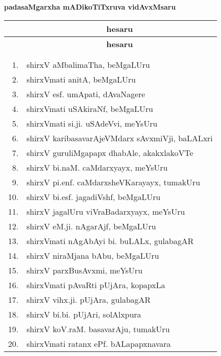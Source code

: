 \begin{center}
{\large\bf padasaMgarxha mADikoTiTxruva vidAvxMsaru}

\thispagestyle{empty}

\lhead[]{}
\rhead[]{}

\begin{minipage}[t]{7cm}
{\renewcommand{\arraystretch}{1.5}
\begin{longtable}{rl}
\hline
{\bf } & \multicolumn{1}{c}{\bf hesaru}\\[3pt]
\hline
\endfirsthead
\hline
{\bf } & \multicolumn{1}{c}{\bf hesaru}\\[3pt]
\hline
  & \\[-10pt]
\endhead
\endfoot
\endlastfoot
  & \\[-15pt]
1. & shirxV aMbalimaTha, beMgaLUru\\
2. & shirxVmati anitA, beMgaLUru\\
3. & shirxV esf. umApati, dAvaNagere\\
4. & shirxVmati uSAkiraNf, beMgaLUru\\
5. & shirxVmati si.ji. uSAdeVvi, meYsUru\\
6. & shirxV karibasavarAjeVMdarx sAvxmiVji, baLALxri\\
7. & shirxV guruliMgapapx dhabAle, akakxlakoVTe\\
8. & shirxV bi.naM. caMdarxyayx, meYsUru\\
9. & shirxV pi.enf. caMdarxsheVKarayayx, tumakUru\\
10. & shirxV bi.esf. jagadiVshf, beMgaLUru\\
11. & shirxV jagalUru viVraBadarxyayx, meYsUru\\
12. & shirxV eM.ji. nAgarAjf, beMgaLUru\\
13. &  shirxVmati nAgAbAyi bi. buLALx, gulabagAR\\
14. & shirxV niraMjana bAbu, beMgaLUru\\
15. & shirxV parxBusAvxmi, meYsUru\\
16. & shirxVmati pAvaRti pUjAra, kopapxLa\\
17. & shirxV vihx.ji. pUjAra, gulabagAR\\
18. & shirxV bi.bi. pUjAri, solAlxpura\\
19. & shirxV koV.raM. basavarAju, tumakUru\\
20. & shirxVmati ratanx ePf. bALapapxnavara 

\end{longtable}}
\end{minipage}
\end{center}
